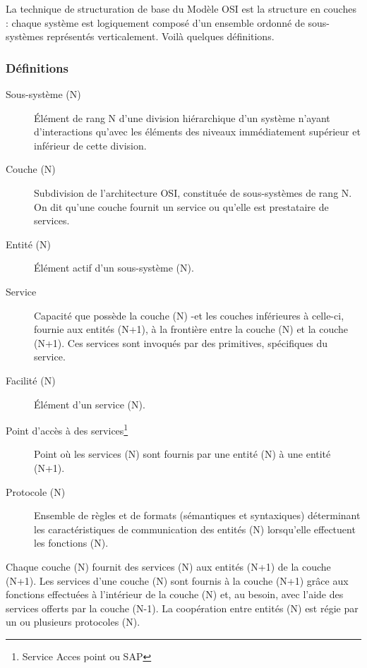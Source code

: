 La technique de structuration de base du Modèle OSI est la structure en couches : chaque système est logiquement composé d'un ensemble ordonné de sous-systèmes représentés verticalement. Voilà quelques définitions.
\subsubsection{Définitions}
\begin{description}
	\item[Sous-système (N)]\'Elément de rang N d'une division hiérarchique d'un système n'ayant d'interactions qu'avec les éléments des niveaux immédiatement supérieur et inférieur de cette division.
	\item[Couche (N)] Subdivision de l'architecture OSI, constituée de sous-systèmes de rang N. On dit qu'une couche fournit un service ou qu'elle est prestataire de services.
	\item[Entité (N)] Élément actif d'un sous-système (N).
	\item[Service] Capacité que possède la couche (N) -et les couches inférieures à celle-ci, fournie aux entités (N+1), à la frontière entre la couche (N) et la couche (N+1). Ces services sont invoqués par des primitives, spécifiques du service.
	\item[Facilité (N)]Élément d'un service (N).
	\item[Point d'accès à des services\footnote{Service Acces point ou SAP}] Point où les services (N) sont fournis par une entité (N) à une entité (N+1).
	\item[Protocole (N)] Ensemble de règles et de formats (sémantiques et syntaxiques) déterminant les caractéristiques de communication des entités (N) lorsqu'elle effectuent les fonctions (N).
\end{description}

Chaque couche (N) fournit des services (N) aux entités (N+1) de la couche (N+1). Les services d'une couche (N) sont fournis à la couche (N+1) grâce aux fonctions effectuées à l'intérieur de la couche (N) et, au besoin, avec l'aide des services offerts par la couche (N-1).
La coopération entre entités (N) est régie par un ou plusieurs protocoles (N).

